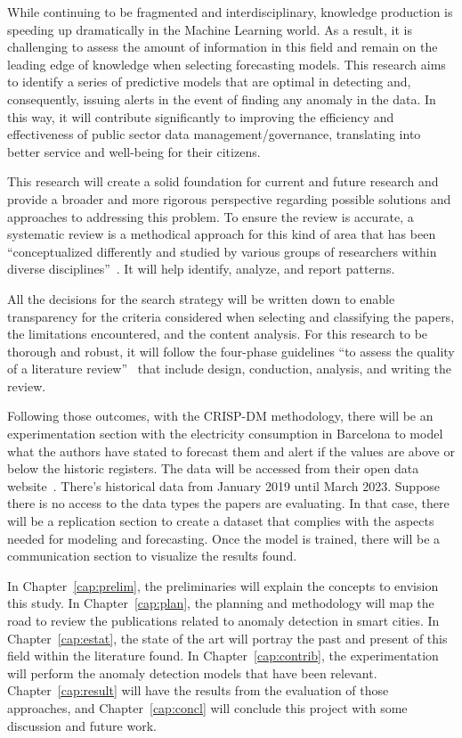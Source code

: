 \documentclass[a4paper,12pt,twoside]{ThesisStyle}
\begin{document}
While continuing to be fragmented and interdisciplinary, knowledge production is speeding up dramatically in the Machine Learning world. As a result, it is challenging to assess the amount of information in this field and remain on the leading edge of knowledge when selecting forecasting models. This research aims to identify a series of predictive models that are optimal in detecting and, consequently, issuing alerts in the event of finding any anomaly in the data. In this way, it will contribute significantly to improving the efficiency and effectiveness of public sector data management/governance, translating into better service and well-being for their citizens.

This research will create a solid foundation for current and future research and provide a broader and more rigorous perspective regarding possible solutions and approaches to addressing this problem. To ensure the review is accurate, a systematic review is a methodical approach for this kind of area that has been “conceptualized differently and studied by various groups of researchers within diverse disciplines”~\cite{guidelinesMNWong2019}. It will help identify, analyze, and report patterns.

All the decisions for the search strategy will be written down to enable transparency for the criteria considered when selecting and classifying the papers, the limitations encountered, and the content analysis. For this research to be thorough and robust, it will follow the four-phase guidelines “to assess the quality of a literature review”~\cite{guidelinesLRSnyder2019} that include design, conduction, analysis, and writing the review. 

Following those outcomes, with the CRISP-DM methodology, there will be an experimentation section with the electricity consumption in Barcelona to model what the authors have stated to forecast them and alert if the values are above or below the historic registers. The data will be accessed from their open data website~\cite{ElectricityBCNOD}. There’s historical data from January 2019 until March 2023. Suppose there is no access to the data types the papers are evaluating. In that case, there will be a replication section to create a dataset that complies with the aspects needed for modeling and forecasting. Once the model is trained, there will be a communication section to visualize the results found.

In Chapter~\ref{cap:prelim}, the preliminaries will explain the concepts to envision this study. In Chapter~\ref{cap:plan}, the planning and methodology will map the road to review the publications related to anomaly detection in smart cities. In Chapter~\ref{cap:estat}, the state of the art will portray the past and present of this field within the literature found. In Chapter~\ref{cap:contrib}, the experimentation will perform the anomaly detection models that have been relevant. Chapter~\ref{cap:result} will have the results from the evaluation of those approaches, and Chapter~\ref{cap:concl} will conclude this project with some discussion and future work.
\end{document}
